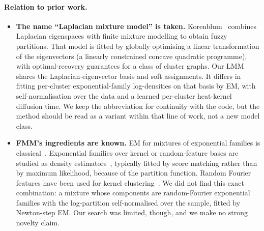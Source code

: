 \documentclass[11pt,a4paper]{article}
\begin{document}
\paragraph{Relation to prior work.}
\begin{itemize}
  \item \textbf{The name ``Laplacian mixture model'' is taken.}
  Korenblum~\cite{korenblum2018laplacian} combines Laplacian eigenspaces with
  finite mixture modelling to obtain fuzzy partitions. That model is fitted
  by globally optimising a linear transformation of the eigenvectors (a
  linearly constrained concave quadratic programme), with optimal-recovery
  guarantees for a class of cluster graphs. Our LMM shares the
  Laplacian-eigenvector basis and soft assignments. It differs in fitting
  per-cluster exponential-family log-densities on that basis by EM, with
  self-normalisation over the data and a learned per-cluster heat-kernel
  diffusion time. We keep the abbreviation for continuity with the code, but
  the method should be read as a variant within that line of work, not a new
  model class.
  \item \textbf{FMM's ingredients are known.} EM for mixtures of exponential
  families is classical~\cite{banerjee2005clustering}. Exponential families
  over kernel or random-feature bases are studied as density
  estimators~\cite{sriperumbudur2017density}, typically fitted by score
  matching rather than by maximum likelihood, because of the partition
  function. Random Fourier features have been used for kernel
  clustering~\cite{chitta2012efficient}. We did not find this exact
  combination: a mixture whose components are random-Fourier exponential
  families with the log-partition self-normalised over the sample, fitted by
  Newton-step EM. Our search was limited, though, and we make no strong novelty
  claim.
\end{itemize}
\end{document}

